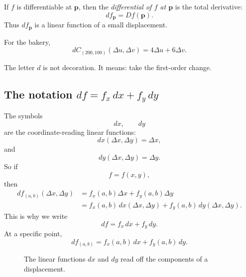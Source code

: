 \begin{definition}
If \(f\) is differentiable at \(\mathbf p\), then the \emph{differential of \(f\) at
\(\mathbf p\)} is the total derivative:
\[
\boxed{
    df_{\mathbf p}=Df(\mathbf p).
}
\]
Thus \(df_{\mathbf p}\) is a linear function of a small displacement.
\end{definition}

For the bakery,
\[
    dC_{(200,100)}(\Delta u,\Delta v)
    =
    4\Delta u+6\Delta v.
\]

The letter \(d\) is not decoration.  It means: take the first-order change.

\subsection{The notation \texorpdfstring{\(df=f_x\,dx+f_y\,dy\)}{df = fx dx + fy dy}}

The symbols
\[
    dx,\qquad dy
\]
are the coordinate-reading linear functions:
\[
    dx(\Delta x,\Delta y)=\Delta x,
\]
and
\[
    dy(\Delta x,\Delta y)=\Delta y.
\]
So if
\[
    f=f(x,y),
\]
then
\[
\begin{aligned}
df_{(a,b)}(\Delta x,\Delta y)
&=
f_x(a,b)\Delta x+f_y(a,b)\Delta y\\
&=
f_x(a,b)\,dx(\Delta x,\Delta y)
+
f_y(a,b)\,dy(\Delta x,\Delta y).
\end{aligned}
\]
This is why we write
\[
\boxed{
    df=f_x\,dx+f_y\,dy.
}
\]
At a specific point,
\[
\boxed{
    df_{(a,b)}
    =
    f_x(a,b)\,dx+f_y(a,b)\,dy.
}
\]

\begin{figure}[h]
\centering
{}
\caption{The linear functions \(dx\) and \(dy\) read off the components of a displacement.}
\end{figure}

